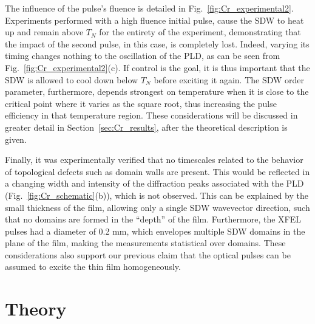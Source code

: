 The influence of the pulse's fluence is detailed in Fig.~\ref{fig:Cr_experimental2}.
Experiments performed with a high fluence initial pulse, cause the \gls{SDW} to heat up and remain above $T_N$ for the entirety of the experiment, demonstrating that the impact of the second pulse, in this case, is completely lost. Indeed, varying its timing changes nothing to the oscillation of the \gls{PLD}, as can be seen from Fig.~\ref{fig:Cr_experimental2}(c).
If control is the goal, it is thus important that the \gls{SDW} is allowed to cool down below $T_N$ before exciting it again.
The \gls{SDW} order parameter, furthermore, depends strongest on temperature when it is close to the critical point where it varies as the square root, thus increasing the pulse efficiency in that temperature region.
These considerations will be discussed in greater detail in Section~\ref{sec:Cr_results}, after the theoretical description is given.

Finally, it was experimentally verified that no timescales related to the behavior of topological defects such as domain walls are present. This would be reflected in a changing width and intensity of the diffraction peaks associated with the \gls{PLD} (Fig.~\ref{fig:Cr_schematic}(b)), which is not observed. This can be explained by the small thickness of the film, allowing only a single \gls{SDW} wavevector direction, such that no domains are formed in the ``depth'' of the film. Furthermore, the \gls{XFEL} pulses had a diameter of 0.2 mm, which envelopes multiple \gls{SDW} domains in the plane of the film\cite{Nicholson2016}, making the measurements statistical over domains.
These considerations also support our previous claim that the optical pulses can be assumed to excite the thin film homogeneously. 
\section{Theory \label{sec:Cr_model}}

